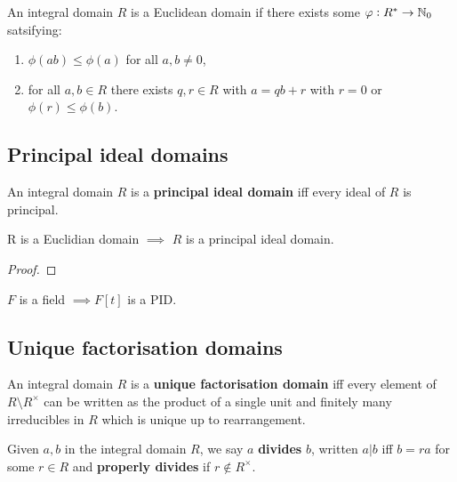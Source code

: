 \documentclass{report}
\begin{document}
\begin{definition}
    An integral domain $R$ is a Euclidean domain if there exists some  $\varphi:R^*\rightarrow\mathbb{N}_0$ satsifying: \begin{enumerate}
        \item $\phi(ab)\leq\phi(a)$ for all $a,b\neq 0$,
        \item for all $a,b\in R$ there exists $q,r\in R$ with $a=qb+r$ with $r=0$ or $\phi(r)\leq\phi(b)$.
    \end{enumerate}
\end{definition}

\subsection{Principal ideal domains}

\begin{definition}
    An integral domain $R$ is a \textbf{principal ideal domain} iff every ideal of $R$ is principal.
\end{definition}

\begin{theorem}
    R is a Euclidian domain $\implies$ $R$ is a principal ideal domain.
    \begin{proof}
        
    \end{proof}
\end{theorem}

\begin{corollary}
    $F$ is a field $\implies F[t]$ is a PID.
\end{corollary}

\subsection{Unique factorisation domains}

\begin{definition}
    An integral domain $R$ is a \textbf{unique factorisation domain} iff every element of $R\setminus R^\times$ can be written as the product of a single unit and finitely many irreducibles in $R$ which is unique up to rearrangement.
\end{definition}

\begin{definition}[Division]
    Given $a,b$ in the integral domain $R$, we say $a$ \textbf{divides} $b$, written $a|b$ iff $b=ra$ for some $r\in R$ and \textbf{properly divides} if $r\not\in R^\times$.
\end{definition}
\end{document}
